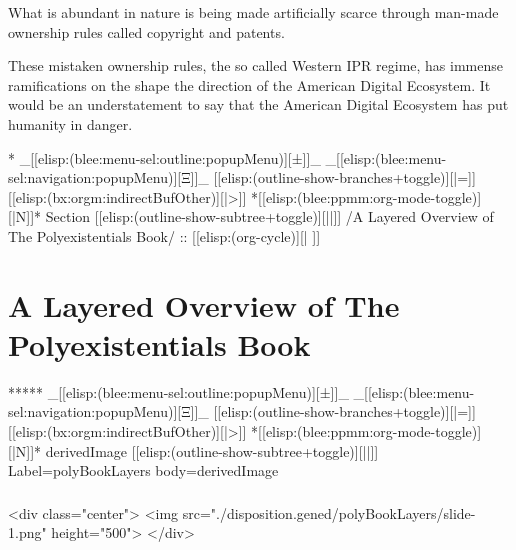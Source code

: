 \begin{whenOrg}
\begin{verblatex}
\begin{frame}[fragile,plain,label=fullBystarStory]
{  What is abundant in nature is being made artificially scarce through man-made
  ownership rules called copyright and patents.

  These mistaken ownership rules, the so called Western IPR regime, has immense ramifications on
  the shape the direction of the American Digital Ecosystem.
  It would be an understatement to say that the American Digital Ecosystem has put humanity in danger.
}
\end{frame}
\end{verblatex}

\begin{whenOrg}
*  _[[elisp:(blee:menu-sel:outline:popupMenu)][±]]_ _[[elisp:(blee:menu-sel:navigation:popupMenu)][Ξ]]_ [[elisp:(outline-show-branches+toggle)][|=]] [[elisp:(bx:orgm:indirectBufOther)][|>]] *[[elisp:(blee:ppmm:org-mode-toggle)][|N]]*  Section    [[elisp:(outline-show-subtree+toggle)][||]]   /A Layered Overview of The Polyexistentials Book/ ::  [[elisp:(org-cycle)][| ]]
\end{whenOrg}

\section{A Layered Overview of The Polyexistentials Book}

\begin{whenOrg}
*****  _[[elisp:(blee:menu-sel:outline:popupMenu)][±]]_ _[[elisp:(blee:menu-sel:navigation:popupMenu)][Ξ]]_ [[elisp:(outline-show-branches+toggle)][|=]] [[elisp:(bx:orgm:indirectBufOther)][|>]] *[[elisp:(blee:ppmm:org-mode-toggle)][|N]]*  derivedImage [[elisp:(outline-show-subtree+toggle)][||]] Label=polyBookLayers  body=derivedImage
\end{whenOrg}

\begin{htmlonly}

\begin{frame}[fragile,plain,label=polyBookLayers]
    \frametitle{}
    \framesubtitle{}
    \begin{rawhtml}
<div class="center">
<img src="./disposition.gened/polyBookLayers/slide-1.png" height="500">
</div>
    \end{rawhtml}
\end{frame}
\end{htmlonly}


\end{whenOrg}
